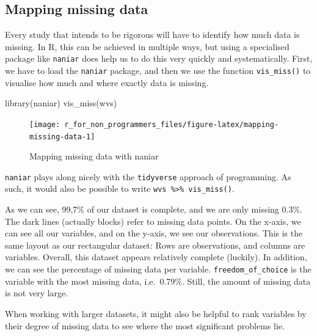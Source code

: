 \documentclass[
]{book}
\newenvironment{Shaded}{\begin{snugshade}}{\end{snugshade}}
\newcommand{\FunctionTok}[1]{\textcolor[rgb]{0.00,0.00,0.00}{#1}}
\newcommand{\NormalTok}[1]{#1}
\begin{document}
\hypertarget{mapping-missing-data}{%
\subsection{Mapping missing data}\label{mapping-missing-data}}

Every study that intends to be rigorous will have to identify how much data is missing. In R, this can be achieved in multiple ways, but using a specialised package like \texttt{naniar} does help us to do this very quickly and systematically. First, we have to load the \texttt{naniar} package, and then we use the function \texttt{vis\_miss()} to visualise how much and where exactly data is missing.

\begin{Shaded}
\begin{Highlighting}[]
\FunctionTok{library}\NormalTok{(naniar)}
\FunctionTok{vis\_miss}\NormalTok{(wvs)}
\end{Highlighting}
\end{Shaded}

\begin{figure}

{\centering \texttt{[image: r\_for\_non\_programmers\_files/figure-latex/mapping-missing-data-1]} 

}

\caption{Mapping missing data with naniar}\label{fig:mapping-missing-data}
\end{figure}

\texttt{naniar} plays along nicely with the \texttt{tidyverse} approach of programming. As such, it would also be possible to write \texttt{wvs\ \%\textgreater{}\%\ vis\_miss()}.

As we can see, 99,7\% of our dataset is complete, and we are only missing 0.3\%. The dark lines (actually blocks) refer to missing data points. On the x-axis, we can see all our variables, and on the y-axis, we see our observations. This is the same layout as our rectangular dataset: Rows are observations, and columns are variables. Overall, this dataset appears relatively complete (luckily). In addition, we can see the percentage of missing data per variable. \texttt{freedom\_of\_choice} is the variable with the most missing data, i.e.~0.79\%. Still, the amount of missing data is not very large.

When working with larger datasets, it might also be helpful to rank variables by their degree of missing data to see where the most significant problems lie.
\end{document}
